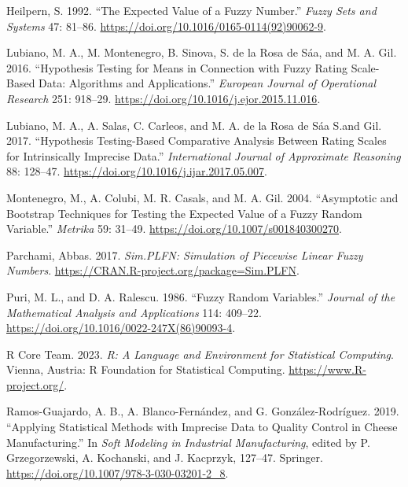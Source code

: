 \begin{CSLReferences}{1}{0}
\leavevmode{}%
Heilpern, S. 1992. {``The Expected Value of a Fuzzy Number.''} \emph{Fuzzy Sets and Systems} 47: 81--86. \url{https://doi.org/10.1016/0165-0114(92)90062-9}.

\leavevmode{}%
Lubiano, M. A., M. Montenegro, B. Sinova, S. de la Rosa de Sáa, and M. A. Gil. 2016. {``Hypothesis Testing for Means in Connection with Fuzzy Rating Scale-Based Data: Algorithms and Applications.''} \emph{European Journal of Operational Research} 251: 918--29. \url{https://doi.org/10.1016/j.ejor.2015.11.016}.

\leavevmode{}%
Lubiano, M. A., A. Salas, C. Carleos, and M. A. de la Rosa de Sáa S.and Gil. 2017. {``Hypothesis Testing-Based Comparative Analysis Between Rating Scales for Intrinsically Imprecise Data.''} \emph{International Journal of Approximate Reasoning} 88: 128--47. \url{https://doi.org/10.1016/j.ijar.2017.05.007}.

\leavevmode{}%
Montenegro, M., A. Colubi, M. R. Casals, and M. A. Gil. 2004. {``Asymptotic and Bootstrap Techniques for Testing the Expected Value of a Fuzzy Random Variable.''} \emph{Metrika} 59: 31--49. \url{https://doi.org/10.1007/s001840300270}.

\leavevmode{}%
Parchami, Abbas. 2017. \emph{Sim.PLFN: Simulation of Piecewise Linear Fuzzy Numbers}. \url{https://CRAN.R-project.org/package=Sim.PLFN}.

\leavevmode{}%
Puri, M. L., and D. A. Ralescu. 1986. {``Fuzzy Random Variables.''} \emph{Journal of the Mathematical Analysis and Applications} 114: 409--22. \url{https://doi.org/10.1016/0022-247X(86)90093-4}.

\leavevmode{}%
R Core Team. 2023. \emph{R: A Language and Environment for Statistical Computing}. Vienna, Austria: R Foundation for Statistical Computing. \url{https://www.R-project.org/}.

\leavevmode{}%
Ramos-Guajardo, A. B., A. Blanco-Fernández, and G. González-Rodríguez. 2019. {``Applying Statistical Methods with Imprecise Data to Quality Control in Cheese Manufacturing.''} In \emph{Soft Modeling in Industrial Manufacturing}, edited by P. Grzegorzewski, A. Kochanski, and J. Kacprzyk, 127--47. Springer. \url{https://doi.org/10.1007/978-3-030-03201-2_8}.


\end{CSLReferences}
